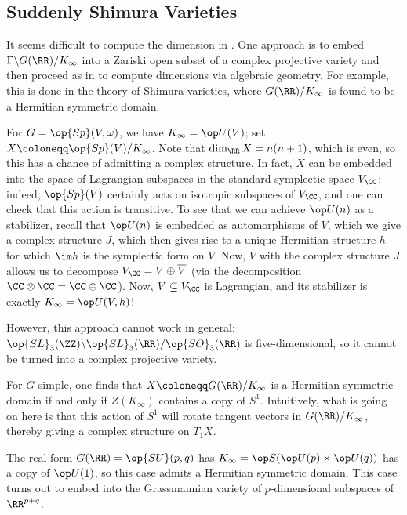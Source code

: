 \documentclass[../notes.tex]{subfiles}
\begin{document}
\subsection{Suddenly Shimura Varieties}
It seems difficult to compute the dimension in . One approach is to embed $\Gamma\backslash G(\RR)/K_\infty$ into a Zariski open subset of a complex projective variety and then proceed as in  to compute dimensions via algebraic geometry. For example, this is done in the theory of Shimura varieties, where $G(\RR)/K_\infty$ is found to be a Hermitian symmetric domain.
\begin{example}
	For $G=\op{Sp}(V,\omega)$, we have $K_\infty=\op U(V)$; set $X\coloneqq\op{Sp}(V)/K_\infty$. Note that $\dim_\RR X=n(n+1)$, which is even, so this has a chance of admitting a complex structure. In fact, $X$ can be embedded into the space of Lagrangian subspaces in the standard symplectic space $V_\CC$: indeed, $\op{Sp}(V)$ certainly acts on isotropic subspaces of $V_\CC$, and one can check that this action is transitive. To see that we can achieve $\op U(n)$ as a stabilizer, recall that $\op U(n)$ is embedded as automorphisms of $V$, which we give a complex structure $J$, which then gives rise to a unique Hermitian structure $h$ for which $\im h$ is the symplectic form on $V$. Now, $V$ with the complex structure $J$ allows us to decompose $V_\CC=V\oplus\overline V$ (via the decomposition $\CC\otimes\CC=\CC\oplus\CC$). Now, $V\subseteq V_\CC$ is Lagrangian, and its stabilizer is exactly $K_\infty=\op U(V,h)$!
\end{example}
\begin{example}
	However, this approach cannot work in general: $\op{SL}_3(\ZZ)\backslash\op{SL}_3(\RR)/\op{SO}_3(\RR)$ is five-dimen\-sional, so it cannot be turned into a complex projective variety.
\end{example}
\begin{remark}
	For $G$ simple, one finds that $X\coloneqq G(\RR)/K_\infty$ is a Hermitian symmetric domain if and only if $Z(K_\infty)$ contains a copy of $S^1$. Intuitively, what is going on here is that this action of $S^1$ will rotate tangent vectors in $G(\RR)/K_\infty$, thereby giving a complex structure on $T_1X$.
\end{remark}
\begin{example}
	The real form $G(\RR)=\op{SU}(p,q)$ has $K_\infty=\op S(\op U(p)\times\op U(q))$ has a copy of $\op U(1)$, so this case admits a Hermitian symmetric domain. This case turns out to embed into the Grassmannian variety of $p$-dimensional subspaces of $\RR^{p+q}$.
\end{example}
\end{document}

